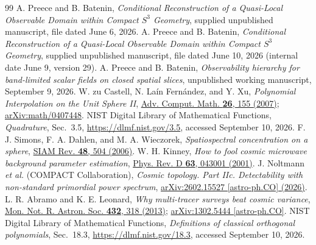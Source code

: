 \documentclass[aps,prd,reprint,amsmath,amssymb,nofootinbib,
longbibliography]{revtex4-2}
\begin{document}
\begin{thebibliography}{99}
 A. Preece and B. Batenin,
\emph{Conditional Reconstruction of a Quasi-Local Observable Domain
within Compact $S^3$ Geometry}, supplied unpublished manuscript,
file dated June 6, 2026.
 A. Preece and B. Batenin,
\emph{Conditional Reconstruction of a Quasi-Local Observable Domain
within Compact $S^3$ Geometry}, supplied unpublished manuscript,
file dated June 10, 2026 (internal date June 9, version 29).
 A. Preece and B. Batenin,
\emph{Observability hierarchy for band-limited scalar fields on closed
spatial slices}, unpublished working manuscript, September 9, 2026.
 W. zu Castell, N. La\'in Fern\'andez, and Y. Xu,
\emph{Polynomial Interpolation on the Unit Sphere II},
\href{https://doi.org/10.1007/s10444-005-7510-5}
{Adv. Comput. Math. \textbf{26}, 155 (2007)};
\href{https://arxiv.org/abs/math/0407448}{arXiv:math/0407448}.
 NIST Digital Library of Mathematical Functions,
\emph{Quadrature}, Sec.~3.5,
\url{https://dlmf.nist.gov/3.5}, accessed September 10, 2026.
 F. J. Simons, F. A. Dahlen, and M. A. Wieczorek,
\emph{Spatiospectral concentration on a sphere},
\href{https://doi.org/10.1137/S0036144504445765}
{SIAM Rev. \textbf{48}, 504 (2006)}.
 W. H. Kinney,
\emph{How to fool cosmic microwave background parameter estimation},
\href{https://doi.org/10.1103/PhysRevD.63.043001}
{Phys. Rev. D \textbf{63}, 043001 (2001)}.
 J. Noltmann \emph{et al.} (COMPACT Collaboration),
\emph{Cosmic topology. Part IIc. Detectability with non-standard primordial
power spectrum},
\href{https://arxiv.org/abs/2602.15527}
{arXiv:2602.15527 [astro-ph.CO] (2026)}.
 L. R. Abramo and K. E. Leonard,
\emph{Why multi-tracer surveys beat cosmic variance},
\href{https://doi.org/10.1093/mnras/stt465}
{Mon. Not. R. Astron. Soc. \textbf{432}, 318 (2013)};
\href{https://arxiv.org/abs/1302.5444}{arXiv:1302.5444 [astro-ph.CO]}.
 NIST Digital Library of Mathematical Functions,
\emph{Definitions of classical orthogonal polynomials}, Sec.~18.3,
\url{https://dlmf.nist.gov/18.3}, accessed September 10, 2026.
\end{thebibliography}
\end{document}
